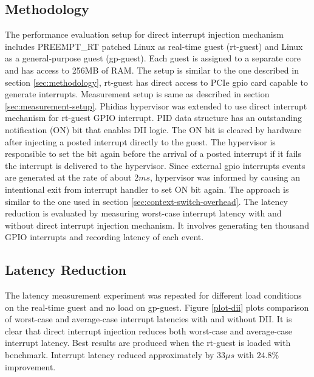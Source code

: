 


\subsection{Methodology}
The performance evaluation setup for direct interrupt injection mechanism includes PREEMPT\_RT patched Linux as real-time guest (rt-guest)
and Linux as a general-purpose guest (gp-guest). Each guest is assigned to a separate core and has access to 256MB of RAM. The setup is 
similar to the one described in section \ref{sec:methodology}, rt-guest has direct access to PCIe gpio card capable to generate interrupts. 
Measurement setup is same as described in section \ref{sec:measurement-setup}.
Phidias hypervisor was extended to use direct interrupt mechanism for rt-guest GPIO interrupt.
PID data structure has an outstanding notification (ON) bit that enables DII logic. 
The ON bit is cleared by hardware after injecting a posted interrupt directly to the guest. 
The hypervisor is responsible to set the bit again before the arrival of a posted interrupt if it fails the interrupt is delivered to the hypervisor.
Since external gpio interrupts events are generated at the rate of about $2ms$, hypervisor was informed by causing an intentional exit from interrupt handler to
set ON bit again. The approach is similar to the one used in section \ref{sec:context-switch-overhead}.
The latency reduction is evaluated by measuring worst-case interrupt latency with and without direct interrupt injection mechanism.
It involves generating ten thousand GPIO interrupts and recording latency of each event.

\subsection{Latency Reduction}


The latency measurement experiment was repeated for different load conditions on the real-time guest and no load on gp-guest. 
Figure \ref{plot-dii} plots comparison of worst-case and average-case interrupt latencies with and without DII. 
It is clear that direct interrupt injection reduces both worst-case and average-case interrupt latency. 
Best results are produced when the rt-guest is loaded with \mcachepressure{} benchmark. 
Interrupt latency reduced approximately by $33\mu{}s$ with $24.8\%$ improvement.

